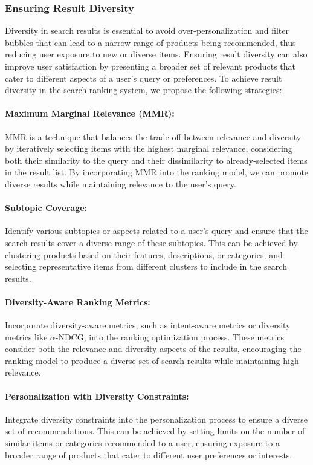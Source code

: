 \documentclass[12pt]{article}
\begin{document}
\subsubsection{Ensuring Result Diversity}
Diversity in search results is essential to avoid over-personalization and filter bubbles that can lead to a narrow range of products being recommended, thus reducing user exposure to new or diverse items. Ensuring result diversity can also improve user satisfaction by presenting a broader set of relevant products that cater to different aspects of a user's query or preferences. To achieve result diversity in the search ranking system, we propose the following strategies:

\paragraph{Maximum Marginal Relevance (MMR):}
MMR is a technique that balances the trade-off between relevance and diversity by iteratively selecting items with the highest marginal relevance, considering both their similarity to the query and their dissimilarity to already-selected items in the result list. By incorporating MMR into the ranking model, we can promote diverse results while maintaining relevance to the user's query.

\paragraph{Subtopic Coverage:}
Identify various subtopics or aspects related to a user's query and ensure that the search results cover a diverse range of these subtopics. This can be achieved by clustering products based on their features, descriptions, or categories, and selecting representative items from different clusters to include in the search results.

\paragraph{Diversity-Aware Ranking Metrics:}
Incorporate diversity-aware metrics, such as intent-aware metrics or diversity metrics like $\alpha$-NDCG, into the ranking optimization process. These metrics consider both the relevance and diversity aspects of the results, encouraging the ranking model to produce a diverse set of search results while maintaining high relevance.

\paragraph{Personalization with Diversity Constraints:}
Integrate diversity constraints into the personalization process to ensure a diverse set of recommendations. This can be achieved by setting limits on the number of similar items or categories recommended to a user, ensuring exposure to a broader range of products that cater to different user preferences or interests.
\end{document}
